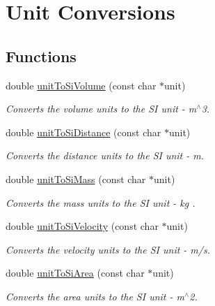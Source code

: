 \hypertarget{group__unit__conv}{
\section{Unit Conversions}
\label{group__unit__conv}
}
\subsection*{Functions}
\begin{CompactItemize}
\item 
double \hyperlink{group__unit__conv_g6b53eb2372b6c68e82cda5b9cb4049ea}{unitToSiVolume} (const char $\ast$unit)
\begin{CompactList}\small\item\em Converts the volume units to the SI unit - m$^\wedge$3. \item\end{CompactList}\item 
double \hyperlink{group__unit__conv_g84e5b74d2c5f3b0bbe1cdb8aff2b11d0}{unitToSiDistance} (const char $\ast$unit)
\begin{CompactList}\small\item\em Converts the distance units to the SI unit - m. \item\end{CompactList}\item 
double \hyperlink{group__unit__conv_g8d02fac0f3c4ac8a798e30cc6a747904}{unitToSiMass} (const char $\ast$unit)
\begin{CompactList}\small\item\em Converts the mass units to the SI unit - kg . \item\end{CompactList}\item 
double \hyperlink{group__unit__conv_ge05c76a067cfe4916abf317f00794c63}{unitToSiVelocity} (const char $\ast$unit)
\begin{CompactList}\small\item\em Converts the velocity units to the SI unit - m/s. \item\end{CompactList}\item 
double \hyperlink{group__unit__conv_g9a55776d67d05ae1fccb1c8d9fe284f1}{unitToSiArea} (const char $\ast$unit)
\begin{CompactList}\small\item\em Converts the area units to the SI unit - m$^\wedge$2. \item\end{CompactList}\item 

\end{CompactItemize}
